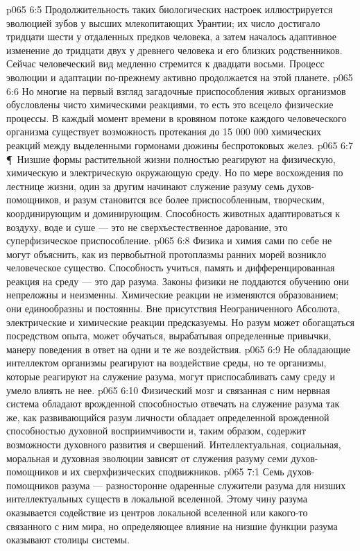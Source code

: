 \vs p065 6:5 Продолжительность таких биологических настроек иллюстрируется эволюцией зубов у высших млекопитающих Урантии; их число достигало тридцати шести у отдаленных предков человека, а затем началось адаптивное изменение до тридцати двух у древнего человека и его близких родственников. Сейчас человеческий вид медленно стремится к двадцати восьми. Процесс эволюции и адаптации по\hyp{}прежнему активно продолжается на этой планете.
\vs p065 6:6 Но многие на первый взгляд загадочные приспособления живых организмов обусловлены чисто химическими реакциями, то есть это всецело физические процессы. В каждый момент времени в кровяном потоке каждого человеческого организма существует возможность протекания до 15 000 000 химических реакций между выделенными гормонами дюжины беспротоковых желез.
\vs p065 6:7 \P\ Низшие формы растительной жизни полностью реагируют на физическую, химическую и электрическую окружающую среду. Но по мере восхождения по лестнице жизни, один за другим начинают служение разуму семь духов\hyp{}помощников, и разум становится все более приспособленным, творческим, координирующим и доминирующим. Способность животных адаптироваться к воздуху, воде и суше --- это не сверхъестественное дарование, это суперфизическое приспособление.
\vs p065 6:8 Физика и химия сами по себе не могут объяснить, как из первобытной протоплазмы ранних морей возникло человеческое существо. Способность учиться, память и дифференцированная реакция на среду --- это дар разума. Законы физики не поддаются обучению они непреложны и неизменны. Химические реакции не изменяются образованием; они единообразны и постоянны. Вне присутствия Неограниченного Абсолюта, электрические и химические реакции предсказуемы. Но разум может обогащаться посредством опыта, может обучаться, вырабатывая определенные привычки, манеру поведения в ответ на одни и те же воздействия.
\vs p065 6:9 Не обладающие интеллектом организмы реагируют на воздействие среды, но те организмы, которые реагируют на служение разума, могут приспосабливать саму среду и умело влиять не нее.
\vs p065 6:10 Физический мозг и связанная с ним нервная система обладают врожденной способностью отвечать на служение разума так же, как развивающийся разум личности обладает определенной врожденной способностью духовной восприимчивости и, таким образом, содержит возможности духовного развития и свершений. Интеллектуальная, социальная, моральная и духовная эволюции зависят от служения разуму семи духов\hyp{}помощников и их сверхфизических сподвижников.
\vs p065 7:1 Семь духов\hyp{}помощников разума --- разносторонне одаренные служители разума для низших интеллектуальных существ в локальной вселенной. Этому чину разума оказывается содействие из центров локальной вселенной или какого\hyp{}то связанного с ним мира, но определяющее влияние на низшие функции разума оказывают столицы системы.
